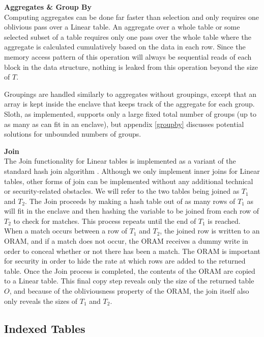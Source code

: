 \documentclass[USenglish,oneside,twocolumn]{article}
\def\name/{Sloth}
\begin{document}
\medskip \noindent \textbf{Aggregates \& Group By}\\
Computing aggregates can be done far faster than selection and only requires one oblivious pass over a Linear table. An aggregate over a whole table or some selected subset of a table requires only one pass over the whole table where the aggregate is calculated cumulatively based on the data in each row. Since the memory access pattern of this operation will always be sequential reads of each block in the data structure, nothing is leaked from this operation beyond the size of $T$. 

Groupings are handled similarly to aggregates without groupings, except that an array is kept inside the enclave that keeps track of the aggregate for each group. \name/, as implemented, supports only a large fixed total number of groups (up to as many as can fit in an enclave), but appendix \ref{groupby} discusses potential solutions for unbounded numbers of groups. 

\medskip \noindent \textbf{Join}\\
The Join functionality for Linear tables is implemented as a variant of the standard hash join algorithm \cite{EN10}. Although we only implement inner joins for Linear tables, other forms of join can be implemented without any additional technical or security-related obstacles. We will refer to the two tables being joined as $T_1$ and $T_2$. The Join proceeds by making a hash table out of as many rows of $T_1$ as will fit in the enclave and then hashing the variable to be joined from each row of $T_2$ to check for matches. This process repeats until the end of $T_1$ is reached. When a match occurs between a row of $T_1$ and $T_2$, the joined row is written to an ORAM, and if a match does not occur, the ORAM receives a dummy write in order to conceal whether or not there has been a match. The ORAM is important for security in order to hide the rate at which rows are added to the returned table. Once the Join process is completed, the contents of the ORAM are copied to a Linear table. This final copy step reveals only the size of the returned table $O$, and because of the obliviousness property of the ORAM, the join itself also only reveals the sizes of $T_1$ and $T_2$. 

\subsection{Indexed Tables}
\end{document}
